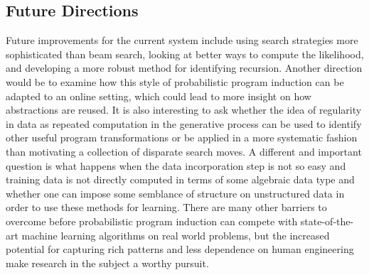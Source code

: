 \documentclass[a4paper,10pt]{article}
\begin{document}
\subsection{Future Directions}
Future improvements for the current system include using search strategies more sophisticated than beam search, looking at better ways to compute the likelihood, and developing a more robust method for identifying recursion.  Another direction would be to examine how this style of probabilistic program induction can be adapted to an online setting, which could lead to more insight on how abstractions are reused.  It is also interesting to ask whether the idea of regularity in data as repeated computation in the generative process can be used to identify other useful program transformations or be applied in a more systematic fashion than motivating a collection of disparate search moves.  A different and important question is what happens when the data incorporation step is not so easy and training data is not directly computed in terms of some algebraic data type and whether one can impose some semblance of structure on unstructured data in order to use these methods for learning.  There are many other barriers to overcome before probabilistic program induction can compete with state-of-the-art machine learning algorithms on real world problems, but the increased potential for capturing rich patterns and less dependence on human engineering make research in the subject a worthy pursuit.


\end{document}
